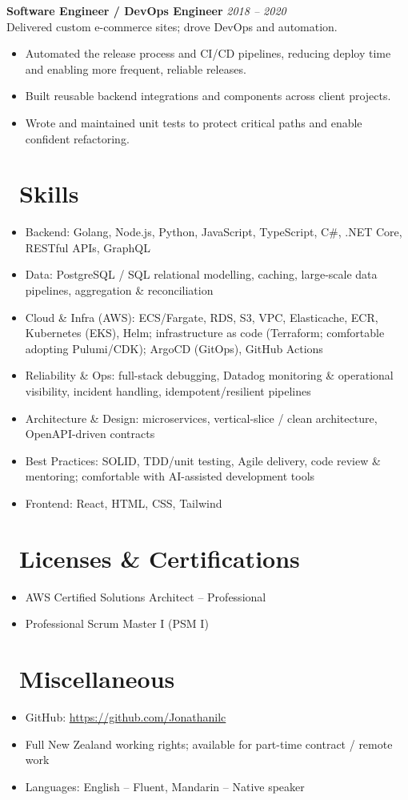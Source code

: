 \documentclass{resume}
\begin{document}
\vspace{1em}

\textbf{Software Engineer / DevOps Engineer} \hfill \textit{2018 -- 2020} \\
Delivered custom e-commerce sites; drove DevOps and automation.
\begin{itemize}
  \item Automated the release process and CI/CD pipelines, reducing deploy time and enabling more frequent, reliable releases.
  \item Built reusable backend integrations and components across client projects.
  \item Wrote and maintained unit tests to protect critical paths and enable confident refactoring.
\end{itemize}


\section{\faCogs\ Skills}
\begin{itemize}[parsep=0.5ex]
  \item Backend: Golang, Node.js, Python, JavaScript, TypeScript, C\#, .NET Core, RESTful APIs, GraphQL
  \item Data: PostgreSQL / SQL relational modelling, caching, large-scale data pipelines, aggregation \& reconciliation
  \item Cloud \& Infra (AWS): ECS/Fargate, RDS, S3, VPC, Elasticache, ECR, Kubernetes (EKS), Helm; infrastructure as code (Terraform; comfortable adopting Pulumi/CDK); ArgoCD (GitOps), GitHub Actions
  \item Reliability \& Ops: full-stack debugging, Datadog monitoring \& operational visibility, incident handling, idempotent/resilient pipelines
  \item Architecture \& Design: microservices, vertical-slice / clean architecture, OpenAPI-driven contracts
  \item Best Practices: SOLID, TDD/unit testing, Agile delivery, code review \& mentoring; comfortable with AI-assisted development tools
  \item Frontend: React, HTML, CSS, Tailwind
\end{itemize}

\section{\faHeartO\ Licenses \& Certifications}
\begin{itemize}[parsep=0.5ex]
  \item AWS Certified Solutions Architect -- Professional
  \item Professional Scrum Master I (PSM I)
\end{itemize}


\section{\faInfo\ Miscellaneous}
\begin{itemize}[parsep=0.5ex]
  \item GitHub: \url{https://github.com/Jonathanilc}
  \item Full New Zealand working rights; available for part-time contract / remote work
  \item Languages: English -- Fluent, Mandarin -- Native speaker
\end{itemize}
\end{document}
